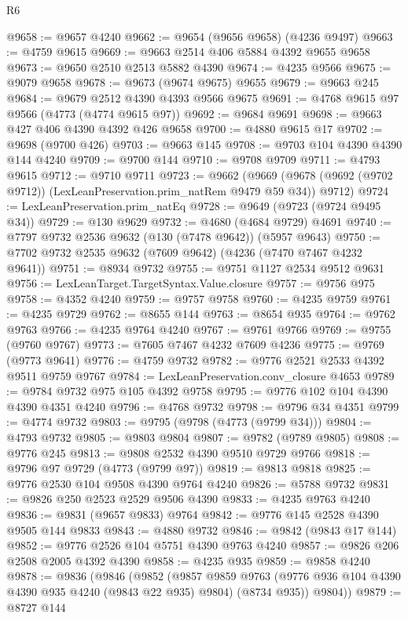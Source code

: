 \begin{lexlean}{R6}
\begin{coremodule}
@9658 := @9657 @4240
@9662 := @9654 (@9656 @9658) (@4236 @9497)
@9663 := @4759 @9615
@9669 := @9663 @2514 @406 @5884 @4392 @9655 @9658
@9673 := @9650 @2510 @2513 @5882 @4390
@9674 := @4235 @9566
@9675 := @9079 @9658
@9678 := @9673 (@9674 @9675) @9655
@9679 := @9663 @245
@9684 := @9679 @2512 @4390 @4393 @9566 @9675
@9691 := @4768 @9615 @97 @9566 (@4773 (@4774 @9615 @97))
@9692 := @9684 @9691
@9698 := @9663 @427 @406 @4390 @4392 @426 @9658
@9700 := @4880 @9615 @17
@9702 := @9698 (@9700 @426)
@9703 := @9663 @145
@9708 := @9703 @104 @4390 @4390 @144 @4240
@9709 := @9700 @144
@9710 := @9708 @9709
@9711 := @4793 @9615
@9712 := @9710 @9711
@9723 := @9662
    (@9669 (@9678 (@9692 (@9702 @9712)) (LexLeanPreservation.prim_natRem @9479 @59 @34)) @9712)
@9724 := LexLeanPreservation.prim_natEq
@9728 := @9649 (@9723 (@9724 @9495 @34))
@9729 := @130 @9629
@9732 := @4680 (@4684 @9729) @4691
@9740 := @7797 @9732 @2536 @9632 (@130 (@7478 @9642)) (@5957 @9643)
@9750 := @7702 @9732 @2535 @9632 (@7609 @9642) (@4236 (@7470 @7467 @4232 @9641))
@9751 := @8934 @9732
@9755 := @9751 @1127 @2534 @9512 @9631
@9756 := LexLeanTarget.TargetSyntax.Value.closure
@9757 := @9756 @975
@9758 := @4352 @4240
@9759 := @9757 @9758
@9760 := @4235 @9759
@9761 := @4235 @9729
@9762 := @8655 @144
@9763 := @8654 @935
@9764 := @9762 @9763
@9766 := @4235 @9764 @4240
@9767 := @9761 @9766
@9769 := @9755 (@9760 @9767)
@9773 := @7605 @7467 @4232 @7609 @4236
@9775 := @9769 (@9773 @9641)
@9776 := @4759 @9732
@9782 := @9776 @2521 @2533 @4392 @9511 @9759 @9767
@9784 := LexLeanPreservation.conv_closure @4653
@9789 := @9784 @9732 @975 @105 @4392 @9758
@9795 := @9776 @102 @104 @4390 @4390 @4351 @4240
@9796 := @4768 @9732
@9798 := @9796 @34 @4351
@9799 := @4774 @9732
@9803 := @9795 (@9798 (@4773 (@9799 @34)))
@9804 := @4793 @9732
@9805 := @9803 @9804
@9807 := @9782 (@9789 @9805)
@9808 := @9776 @245
@9813 := @9808 @2532 @4390 @9510 @9729 @9766
@9818 := @9796 @97 @9729 (@4773 (@9799 @97))
@9819 := @9813 @9818
@9825 := @9776 @2530 @104 @9508 @4390 @9764 @4240
@9826 := @5788 @9732
@9831 := @9826 @250 @2523 @2529 @9506 @4390
@9833 := @4235 @9763 @4240
@9836 := @9831 (@9657 @9833) @9764
@9842 := @9776 @145 @2528 @4390 @9505 @144 @9833
@9843 := @4880 @9732
@9846 := @9842 (@9843 @17 @144)
@9852 := @9776 @2526 @104 @5751 @4390 @9763 @4240
@9857 := @9826 @206 @2508 @2005 @4392 @4390
@9858 := @4235 @935
@9859 := @9858 @4240
@9878 := @9836
    (@9846
      (@9852
        (@9857
          @9859
          @9763
          (@9776 @936 @104 @4390 @4390 @935 @4240 (@9843 @22 @935) @9804)
          (@8734 @935))
        @9804))
@9879 := @8727 @144

\end{coremodule}
\end{lexlean}
